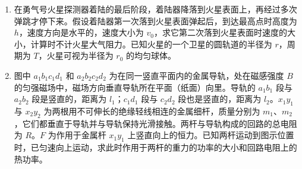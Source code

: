 \documentclass[\gkver]{gaokaozhenti}
\begin{document}
\begin{enumerate}
\item
在勇气号火星探测器着陆的最后阶段，着陆器降落到火星表面上，再经过多次弹跳才停下来。假设着陆器第一次落到火星表面弹起后，到达最高点时高度为 $h$，速度方向是水平的，速度大小为 $v_{0}$，求它第二次落到火星表面时速度的大小，计算时不计火星大气阻力。已知火星的一个卫星的圆轨道的半径为 $r$，周期为 $T$，火星可视为半径为 $r_{0}$ 的均匀球体。
\jdanswer{
\[ v=\sqrt{\frac{8\pi^{2}hr^{3}}{T^{2}r_{0}^{2}}+v_{0}^{2}} \]
}

\item
图中 $a_{1}b_{1}c_{1}d_{1}$ 和 $a_{2}b_{2}c_{2}d_{2}$ 为在同一竖直平面内的金属导轨，处在磁感强度 $B$ 的匀强磁场中，磁场方向垂直导轨所在平面（纸面）向里。导轨的 $a_{1}b_{1}$ 段与 $a_{2}b_{2}$ 段是竖直的，距离为 $l_{1}$；$c_{1}d_{1}$ 段与 $c_{2}d_{2}$ 段也是竖直的，距离为 $l_{2}$。$x_{1}y_{1}$ 与 $x_{2}y_{2}$ 为两根用不可伸长的绝缘轻线相连的金属细杆，质量分别为 $m_{1}$、$m_{2}$，它们都垂直于导轨并与导轨保持光滑接触。两杆与导轨构成的回路的总电阻为 $R$。$F$ 为作用于金属杆 $x_{1}y_{1}$ 上竖直向上的恒力。已知两杆运动到图示位置时，已匀速向上运动，求此时作用于两杆的重力的功率的大小和回路电阻上的热功率。
\jdanswer{
\[ P=\frac{F-(m_{1}+m_{2})g}{B^{2}(l_{2}-l_{1})^{2}}R(m_{1}+m_{2})g,\quad Q=\left[\frac{F-(m_{1}+m_{2})g}{B(l_{2}-l_{1})}\right]^{2}R \]
}
\end{enumerate}
\end{document}
